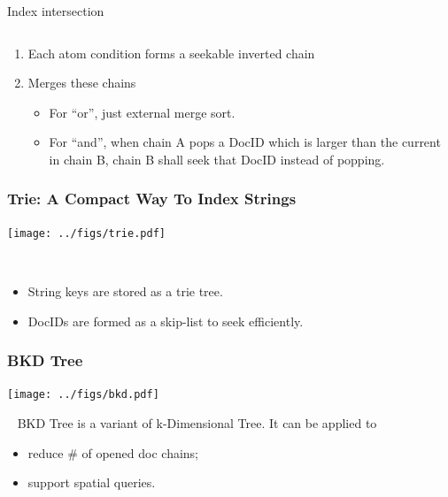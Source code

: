 \documentclass[lualatex]{beamer}
\begin{document}
\begin{frame}[fragile]
\begin{block}{Index intersection}
\begin{verbatim}
    \end{verbatim}
    \begin{enumerate}
      \item Each atom condition forms a seekable inverted chain
      \item Merges these chains
        \begin{itemize}
          \item For ``or'', just external merge sort.
          \item For ``and'',
            when chain A pops a DocID which is larger than the current in chain B,
            chain B shall seek that DocID instead of popping.
        \end{itemize}
    \end{enumerate}
  \end{block}
\end{frame}

\begin{frame}
  \frametitle{Trie: A Compact Way To Index Strings}
  \begin{center}
    \texttt{[image: ../figs/trie.pdf]}
  \end{center}
  \begin{block}{~}
    \begin{itemize}
      \item String keys are stored as a trie tree.
      \item DocIDs are formed as a skip-list to seek efficiently.
    \end{itemize}
  \end{block}
\end{frame}

\begin{frame}
  \frametitle{BKD Tree}
  \begin{center}
    \texttt{[image: ../figs/bkd.pdf]}
  \end{center}
  \begin{block}{~}
    BKD Tree is a variant of k-Dimensional Tree.
    It can be applied to
    \begin{itemize}
      \item reduce \# of opened doc chains;
      \item support spatial queries.
    \end{itemize}
  \end{block}
\end{frame}
\end{document}
